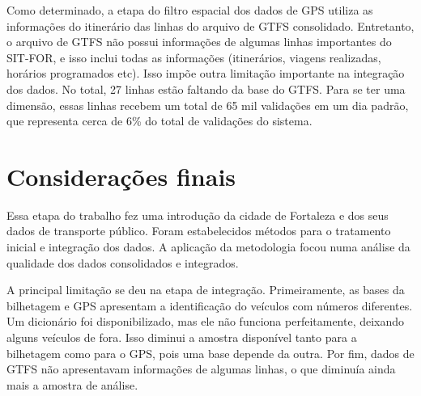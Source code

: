 \documentclass[        
    a4paper,          %
    12pt,             %
    chapter=TITLE,    %
    section=Title,    %
    subsection=Title, %
    oneside,          %
    english,          %
    spanish,          %
    brazil,           %
    fleqn             %
]{abntex2}
\begin{document}
  \begin{figure}[!h]
  \captionsetup{width=16cm}
  \centering
  \end{figure}
  
  Como determinado, a etapa do filtro espacial dos dados de GPS utiliza as informações do itinerário das linhas do arquivo de GTFS consolidado. Entretanto, o arquivo de GTFS não possui informações de algumas linhas importantes do SIT-FOR, e isso inclui todas as informações (itinerários, viagens realizadas, horários programados etc). Isso impõe outra limitação importante na integração dos dados. No total, 27 linhas estão faltando da base do GTFS. Para se ter uma dimensão, essas linhas recebem um total de 65 mil validações em um dia padrão, que representa cerca de 6\% do total de validações do sistema.
  
  \hypertarget{consideracoes-finais-1}{%
  \section{Considerações finais}\label{consideracoes-finais-1}}
  
  Essa etapa do trabalho fez uma introdução da cidade de Fortaleza e dos seus dados de transporte público. Foram estabelecidos métodos para o tratamento inicial e integração dos dados. A aplicação da metodologia focou numa análise da qualidade dos dados consolidados e integrados.
  
  A principal limitação se deu na etapa de integração. Primeiramente, as bases da bilhetagem e GPS apresentam a identificação do veículos com números diferentes. Um dicionário foi disponibilizado, mas ele não funciona perfeitamente, deixando alguns veículos de fora. Isso diminui a amostra disponível tanto para a bilhetagem como para o GPS, pois uma base depende da outra. Por fim, dados de GTFS não apresentavam informações de algumas linhas, o que diminuía ainda mais a amostra de análise.
  
\end{document}
